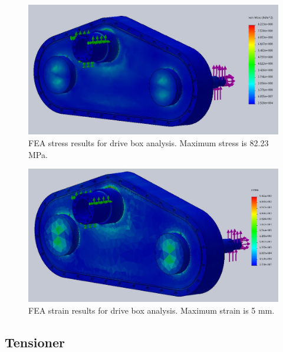 \begin{figure}[H]
\centering
\includegraphics[width=\textwidth]{images/drive_box_stress_fea}
\caption[Drive Box FEA Stress Results]{FEA stress results for drive box analysis. Maximum stress is 82.23 MPa.}
\label{fig:box_fea1}
\end{figure}

\begin{figure}[H]
\centering
\includegraphics[width=\textwidth]{images/drive_box_strain_fea}
\caption[Drive Box FEA Strain Results]{FEA strain results for drive box analysis. Maximum strain is 5 mm.}
\label{fig:box_fea2}
\end{figure}

\subsection{Tensioner}\label{sec:idler_fea}


